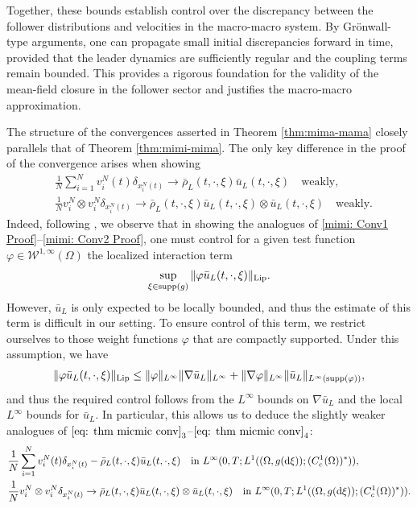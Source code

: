 \documentclass[10pt, reqno]{amsart}
\theoremstyle{definition}
\theoremstyle{remark}
\numberwithin{equation}{section}
\newcommand{\dxi}{\textnormal{d}\xi}
\newcommand{\calW}{\mathcal W}
\begin{document}
Together, these bounds establish control over the discrepancy between the follower distributions and velocities in the macro-macro system. By Gr\"onwall-type arguments, one can propagate small initial discrepancies forward in time, provided that the leader dynamics are sufficiently regular and the coupling terms remain bounded. This provides a rigorous foundation for the validity of the mean-field closure in the follower sector and justifies the macro-macro approximation.

The structure of the convergences asserted in Theorem \ref{thm:mima-mama} closely parallels that of Theorem \ref{thm:mimi-mima}. The only key difference in the proof of the convergence arises when showing
\begin{align*}
    &\frac{1}{N}\sum_{i=1}^N v_i^N(t) \delta_{x_i^N(t)} \to \bar\rho_L(t,\cdot,\xi) \bar u_L(t,\cdot,\xi) \quad \text{weakly}, \\
    &\frac{1}{N} v_i^N \otimes v_i^N \delta_{x_i^N(t)} \to \bar\rho_L(t,\cdot,\xi) \bar u_L(t,\cdot,\xi) \otimes \bar u_L(t,\cdot,\xi) \quad \text{weakly}.
\end{align*}
Indeed, following \cite[Lemma 2.1]{CC21}, we observe that in showing the analogues of \eqref{mimi: Conv1 Proof}--\eqref{mimi: Conv2 Proof}, one must control for a given test function $\varphi\in \calW^{1,\infty}(\Omega)$ the localized interaction term
\begin{align*}
    \sup_{\xi\in \textnormal{supp}(g)} \|\varphi \bar u_L(t,\cdot,\xi)\|_{\rm Lip} .
\end{align*} 
However, $\bar u_L$ is only expected to be locally bounded, and thus the estimate of this term is difficult in our setting. To ensure control of this term, we restrict ourselves to those weight functions $\varphi$ that are compactly supported. Under this assumption, we have
\begin{align*}
    \|\varphi \bar u_L(t,\cdot,\xi)\|_{\rm Lip} \le \|\varphi\|_{L^\infty} \|\nabla \bar u_L \|_{L^\infty} + \|\nabla \varphi\|_{L^\infty} \|\bar u_L\|_{L^\infty(\textnormal{supp}(\varphi))},
\end{align*}
and thus the required control follows from the $L^\infty$ bounds on $\nabla \bar u_L$ and the local $L^\infty$ bounds for $\bar u_L$. In particular, this allows us to deduce the slightly weaker analogues of $\eqref{eq: thm micmic conv}_3$--$\eqref{eq: thm micmic conv}_4$:
\begin{align*}
    &\frac{1}{N}\sum_{i=1}^N v_i^N(t) \delta_{x_i^N(t)} - \bar \rho_L(t,\cdot,\xi) \bar u_L(t,\cdot,\xi) \quad \text{in } L^\infty(0,T;L^1((\Omega,g(\dxi)); (C_c^1(\Omega))^*)),\\
    &\frac{1}{N} v_i^N \otimes v_i^N \delta_{x_i^N(t)} \to \bar\rho_L(t,\cdot,\xi) \bar u_L(t,\cdot,\xi) \otimes \bar u_L(t,\cdot,\xi) \quad \text{in }L^\infty(0,T;L^1((\Omega,g(\dxi)); (C_c^1(\Omega))^*)) .
\end{align*}
\end{document}
